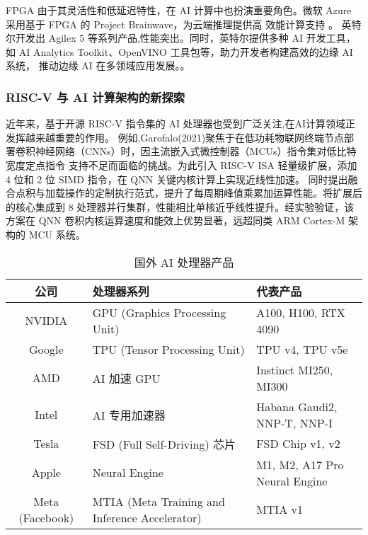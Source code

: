 FPGA 由于其灵活性和低延迟特性，在 AI 计算中也扮演重要角色。微软 Azure 采用基于 FPGA 的 Project Brainwave，为云端推理提供高
效能计算支持 \cite{microsoft2019brainwave}。
英特尔开发出 Agilex 5 等系列产品,性能突出。同时，英特尔提供多种 AI 开发工具，如 AI Analytics Toolkit、OpenVINO 工具包等，助力开发者构建高效的边缘 AI 系统，
推动边缘 AI 在多领域应用发展。\cite{ahmadintel}。

\subsubsection{RISC-V 与 AI 计算架构的新探索}

近年来，基于开源 RISC-V 指令集的 AI 处理器也受到广泛关注,在AI计算领域正发挥越来越重要的作用\cite{kalapothas2023survey}\cite{gomez2023challenges}。
例如,Garofalo(2021)聚焦于在低功耗物联网终端节点部署卷积神经网络（CNNs）时，因主流嵌入式微控制器（MCUs）指令集对低比特宽度定点指令
支持不足而面临的挑战。为此引入 RISC-V ISA 轻量级扩展，添加 4 位和 2 位 SIMD 指令，在 QNN 关键内核计算上实现近线性加速。
同时提出融合点积与加载操作的定制执行范式，提升了每周期峰值乘累加运算性能\cite{garofalo2021xpulpnn}。将扩展后的核心集成到 8 处理器并行集群，性能相比单核近乎线性提升。经实验验证，该方案在 QNN 卷积内核运算速度和能效上优势显著，远超同类 ARM Cortex-M 架构的 MCU 系统。
\begin{table}
    \centering
    \caption{国外 AI 处理器产品}
    \label{tab:ai_chips}
    \begin{tabular}{cll} %
      \toprule
      公司   & 处理器系列                                       & 代表产品                          \\
      \midrule
      {NVIDIA} & GPU (Graphics Processing Unit) & A100, H100, RTX 4090 \\ 
      {Google} & TPU (Tensor Processing Unit) & TPU v4, TPU v5e \\ 
      {AMD} & AI 加速 GPU & Instinct MI250, MI300 \\ 
      {Intel} & AI 专用加速器 & Habana Gaudi2, NNP-T, NNP-I \\ 
      {Tesla} & FSD (Full Self-Driving) 芯片 & FSD Chip v1, v2 \\ 
      {Apple} & Neural Engine & M1, M2, A17 Pro Neural Engine \\ 
      {Meta (Facebook)} & MTIA (Meta Training and Inference Accelerator) & MTIA v1 \\
  
      \bottomrule
    \end{tabular}
\end{table}


